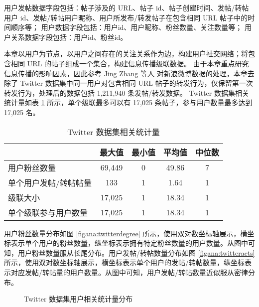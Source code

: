 用户发帖数据字段包括：帖子涉及的 URL、帖子 id、帖子创建时间、发帖/转帖用户 id、发帖/转帖用户昵称、用户所发布/转发帖子在包含相同 URL 帖子中的时间顺序等；
用户数据字段包括：用户id、用户昵称、粉丝数量、关注数量等；
用户关系数据字段包括：用户id、粉丝id。


本章以用户为节点，以用户之间存在的关注关系作为边，构建用户社交网络；将包含相同 URL 的帖子组成一个集合，构建信息传播级联数据。
由于本章重点研究信息传播的影响因素，因此参考 Jing Zhang 等人  \cite{zhang2013social} 对新浪微博数据的处理，本章去除了 Twitter 数据集中同一用户对包含相同 URL 帖子的转发行为，仅保留第一次转发行为，处理后的数据包括 1,211,940 条发帖/转发数据。
Twitter 数据集相关统计量如表 \ref{tabana:twitter} 所示，单个级联最多可以有 17,025 条帖子，参与用户数量最多达到 17,025 名。

\begin{table}[]
	\begin{center}
		\caption{Twitter 数据集相关统计量}
		\begin{tabular}{lcccc}
			\toprule[1.5pt]
			 & 最大值 & 最小值 & 平均值 & 中位数\\
			\midrule[1pt]
			用户粉丝数量 & 69,449 & 0 & 49.86 & 7 \\
			单个用户发帖/转帖帖量 & 133 & 1 & 1.64 & 1 \\
			级联大小 & 17,025 & 1 & 18.34 & 1 \\
			单个级联参与用户数量 & 17,025 & 1 & 18.34 & 1 \\
			\bottomrule[1.5pt]
		\end{tabular}
		\label{tabana:twitter}
		\vspace{\baselineskip}
	\end{center}
\end{table}


用户粉丝数量分布如图 \ref{figana:twitterdegree} 所示，使用双对数坐标轴展示，横坐标表示单个用户的粉丝数量，纵坐标表示拥有特定粉丝数量的用户数量。从图中可知，用户粉丝数量服从长尾分布。用户发帖/转帖数量分布如图 \ref{figana:twitteracts} 所示，使用双对数坐标轴展示，横坐标表示单个用户的发帖/转帖数量，纵坐标表示对应发帖/转帖量的用户数量。从图中可知，用户发帖/转帖数量近似服从密律分布。

\begin{figure}
	\centering
    \caption{Twitter 数据集用户相关统计量分布}
    \label{figana:twitter}
\end{figure}

